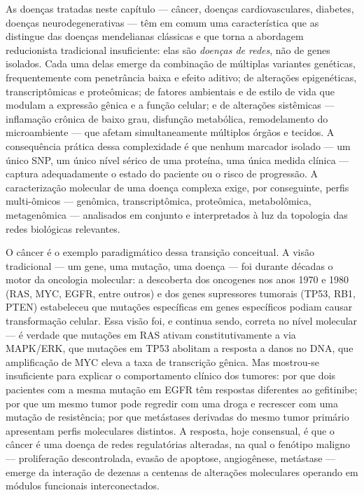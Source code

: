As doenças tratadas neste capítulo --- câncer, doenças cardiovasculares, diabetes, doenças neurodegenerativas --- têm em comum uma característica que as distingue das doenças mendelianas clássicas e que torna a abordagem reducionista tradicional insuficiente: elas são \emph{doenças de redes}, não de genes isolados. Cada uma delas emerge da combinação de múltiplas variantes genéticas, frequentemente com penetrância baixa e efeito aditivo; de alterações epigenéticas, transcriptômicas e proteômicas; de fatores ambientais e de estilo de vida que modulam a expressão gênica e a função celular; e de alterações sistêmicas --- inflamação crônica de baixo grau, disfunção metabólica, remodelamento do microambiente --- que afetam simultaneamente múltiplos órgãos e tecidos. A consequência prática dessa complexidade é que nenhum marcador isolado --- um único SNP, um único nível sérico de uma proteína, uma única medida clínica --- captura adequadamente o estado do paciente ou o risco de progressão. A caracterização molecular de uma doença complexa exige, por conseguinte, perfis multi-ômicos --- genômica, transcriptômica, proteômica, metabolômica, metagenômica --- analisados em conjunto e interpretados à luz da topologia das redes biológicas relevantes.

O câncer é o exemplo paradigmático dessa transição conceitual. A visão tradicional --- um gene, uma mutação, uma doença --- foi durante décadas o motor da oncologia molecular: a descoberta dos oncogenes nos anos 1970 e 1980 (RAS, MYC, EGFR, entre outros) e dos genes supressores tumorais (TP53, RB1, PTEN) estabeleceu que mutações específicas em genes específicos podiam causar transformação celular. Essa visão foi, e continua sendo, correta no nível molecular --- é verdade que mutações em RAS ativam constitutivamente a via MAPK/ERK, que mutações em TP53 abolitam a resposta a danos no DNA, que amplificação de MYC eleva a taxa de transcrição gênica. Mas mostrou-se insuficiente para explicar o comportamento clínico dos tumores: por que dois pacientes com a mesma mutação em EGFR têm respostas diferentes ao gefitinibe; por que um mesmo tumor pode regredir com uma droga e recrescer com uma mutação de resistência; por que metástases derivadas do mesmo tumor primário apresentam perfis moleculares distintos. A resposta, hoje consensual, é que o câncer é uma doença de redes regulatórias alteradas, na qual o fenótipo maligno --- proliferação descontrolada, evasão de apoptose, angiogênese, metástase --- emerge da interação de dezenas a centenas de alterações moleculares operando em módulos funcionais interconectados.


